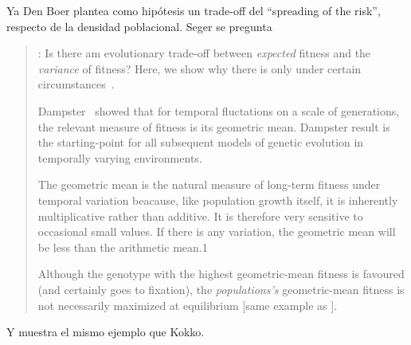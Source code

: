 \documentclass[a4paper,10pt]{article}
\begin{document}
Ya Den Boer plantea como hipótesis un trade-off del ``spreading of the risk'', respecto de la densidad poblacional.
Seger se pregunta
\begin{quotation} \cite{denBoer1968-spreadingRisk}:
    Is there am evolutionary trade-off between \emph{expected} fitness and the \emph{variance} of fitness?
    Here, we show why there is only under certain circumstances~\cite{seger1987-betHedging}.

    Dampster~\cite{dempster1955-geometricMean} showed that for temporal fluctations on a scale of generations, the relevant measure of fitness is its geometric mean.
    Dampster result is the starting-point for all subsequent models of genetic evolution in temporally varying environments.

    The geometric mean is the natural measure of long-term fitness under temporal variation beacause, like population growth itself, it is inherently multiplicative rather than additive.
    It is therefore very sensitive to occasional small values.
    If there is any variation, the geometric mean will be less than the arithmetic mean.1

    Although the genotype with the highest geometric-mean fitness is favoured (and certainly goes to fixation), the \emph{populations's} geometric-mean fitness is not necessarily maximized at equilibrium [same example as \cite{starrfelt2012-bet}].
\end{quotation}
Y muestra el mismo ejemplo que Kokko.

\\
\end{document}
